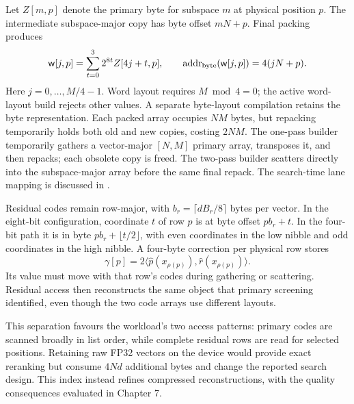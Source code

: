 Let $Z[m,p]$ denote the primary byte for subspace $m$ at physical
position $p$. The intermediate subspace-major copy has byte offset
$mN+p$. Final packing produces
\begin{equation}
 \mathsf w[j,p]=\sum_{t=0}^{3}2^{8t}Z[4j+t,p],\qquad
 \operatorname{addr}_{\rm byte}(\mathsf w[j,p])=4(jN+p).
 \label{eq:4-primary-address}
\end{equation}
Here $j=0,\ldots,M/4-1$. Word layout requires $M\bmod4=0$; the active
word-layout build rejects other values. A separate byte-layout compilation
retains the byte representation. Each packed array occupies $NM$ bytes,
but repacking temporarily holds both old and new copies, costing $2NM$.
The one-pass builder
temporarily gathers a vector-major $[N,M]$ primary array, transposes it, and
then repacks; each obsolete copy is freed. The two-pass builder scatters
directly into the subspace-major array before the same final repack.
The search-time lane mapping is discussed in .

Residual codes remain row-major, with
$b_r=\lceil dB_r/8\rceil$ bytes per vector. In the eight-bit configuration,
coordinate $t$ of row $p$ is at byte offset $pb_r+t$. In the four-bit
path it is in byte $pb_r+\lfloor t/2\rfloor$, with even coordinates
in the low nibble and odd coordinates in the high nibble. A four-byte
correction per physical row stores
\begin{equation}
 \gamma[ p ]=2\langle\widehat p(x_{\rho(p)}),
                              \widehat r(x_{\rho(p)})\rangle.
 \label{eq:4-correction}
\end{equation}
Its value must move with that row's codes during gathering or scattering.
Residual access then reconstructs the same object that primary screening
identified, even though the two code arrays use different layouts.

This separation favours the workload's two access patterns: primary codes
are scanned broadly in list order, while complete residual rows are read
for selected positions. Retaining raw FP32 vectors on the device would
provide exact reranking but consume $4Nd$ additional bytes and change the
reported search design. This index instead refines compressed
reconstructions, with the quality consequences evaluated in Chapter 7.
